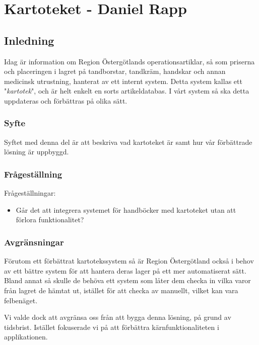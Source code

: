 \section{Kartoteket - Daniel Rapp}
\subsection{Inledning}
Idag är information om Region Östergötlands operationsartiklar, så som priserna och
placeringen i lagret på tandborstar, tandkräm, handskar och annan
medicinsk utrustning, hanterat av ett internt system.
Detta system kallas ett "\textit{kartotek}", och är helt enkelt en sorts artikeldatabas.
I vårt system så ska detta uppdateras och förbättras på olika sätt.

\subsubsection{Syfte}
Syftet med denna del är att beskriva vad kartoteket är samt
hur vår förbättrade lösning är uppbyggd.


\subsubsection{Frågeställning}
Frågeställningar:
\begin{itemize}
  \item Går det att integrera systemet för handböcker med kartoteket utan att förlora funktionalitet?
\end{itemize}


\subsubsection{Avgränsningar}
Förutom ett förbättrat kartotekssystem så är Region Östergötland också i behov av
ett bättre system för att hantera deras lager på ett mer automatiserat sätt.
Bland annat så skulle de behöva ett system som låter dem checka in vilka varor från lagret de hämtat
ut, istället för att checka av manuellt, vilket kan vara felbenäget.

Vi valde dock att avgränsa oss från att bygga denna lösning, på grund av tidsbrist.
Istället fokuserade vi på att förbättra kärnfunktionaliteten i applikationen.


\clearpage
